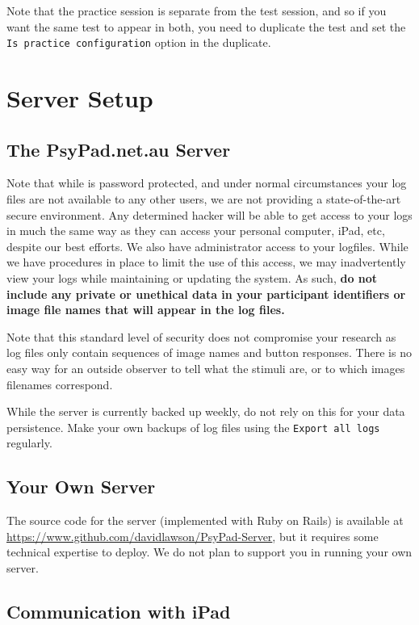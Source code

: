 \documentclass{article}
\begin{document}
Note that the practice session is separate from the test session,
and so if you want the same test to appear in both, you need to
duplicate the test and set the {\tt Is practice configuration} option in the duplicate.

\section{Server Setup}
\label{sec-server}

\subsection{The PsyPad.net.au Server}

Note that while  is password protected, and under 
normal circumstances
your log files are not available to any other users, we are not providing
a state-of-the-art secure environment. Any determined hacker will be able to 
get access to your logs in much the same way as they 
can access your personal computer,
iPad, etc, despite our best efforts.
We also have administrator access to your logfiles. 
While we have procedures in place to
limit the use of this access, we may inadvertently view 
your logs while maintaining or
updating the system. 
As such, {\bf do not include any private or unethical data in
your participant identifiers or image file names 
that will appear in the log files.}

Note that this standard level of security does not compromise your
research as log files only contain sequences of image names and
button responses. There is no easy way for an outside observer 
to tell what the stimuli are, or
to which images filenames correspond.

While the server is currently backed up weekly, do not rely on this for your
data persistence.
Make your own backups of log files using the {\tt Export all logs} 
regularly. 

\subsection{Your Own Server}
\label{sec-ownserver}

The source code for the server (implemented with Ruby on Rails) is available at \url{https://www.github.com/davidlawson/PsyPad-Server}, but it requires some technical expertise to deploy. We do not plan to support you in running your own server.

\subsection{Communication with iPad}
\end{document}

